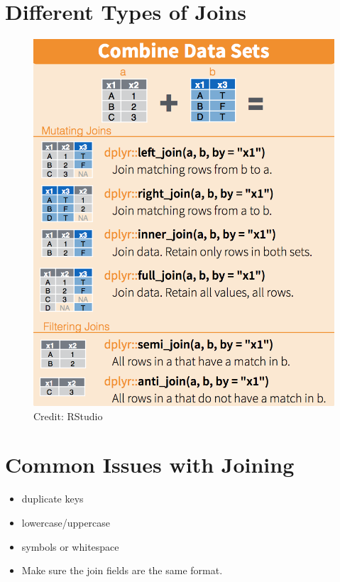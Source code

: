 \documentclass[
  letterpaper,
  DIV=11,
  numbers=noendperiod]{scrartcl}
\providecommand{\tightlist}{%
  \setlength{\itemsep}{0pt}\setlength{\parskip}{0pt}}\usepackage{longtable,booktabs,array}
\begin{document}
\hypertarget{different-types-of-joins}{%
\section{Different Types of Joins}\label{different-types-of-joins}}

\begin{figure}

{\centering \includegraphics{118_I_joining_files/mediabag/joins.png}

}

\caption{Credit: RStudio}

\end{figure}

\hypertarget{common-issues-with-joining}{%
\section{Common Issues with Joining}\label{common-issues-with-joining}}

\begin{itemize}
\tightlist
\item
  duplicate keys
\item
  lowercase/uppercase
\item
  symbols or whitespace
\item
  Make sure the join fields are the same format.
\end{itemize}
\end{document}
